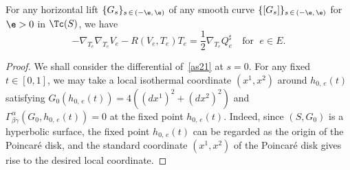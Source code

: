 \begin{lemm}\label{le3}
For any horizontal lift $\{G_s\}_{s\,\in\,(-\e,\,\e)}$ of any smooth curve \linebreak $\{[G_s]\}_{s\,\in\,(-\e,\,\e)}$ for $\e>0$ in $\Tc(S)$, we have
\[
-\nabla_{T_e}\nabla_{T_e}V_e-R\left(V_e, T_e\right)T_e=\frac{1}{2}\nabla_{T_e}Q_{e}^{\sharp} \quad \text{for }\; e \in E.
\]
\end{lemm}

\begin{proof}
We shall consider the differential of~\eqref{as21} at $s=0$. For any fixed $t \in [0, 1]$, we may take a local isothermal coordinate $(x^1,x^2)$ around $h_{0,\,e}(t)$ satisfying $G_0(h_{0,\,e}(t))=4((dx^1)^2+(dx^2)^2)$ and $\Gamma_{\beta\gamma}^{\alpha}(G_0, h_{0,\,e}(t))=0$ at the fixed point $h_{0,\,e}(t)$. Indeed, since $(S,G_0)$ is a hyperbolic surface, the fixed point $h_{0,\,e}(t)$ can be regarded as the origin of the Poincaré disk, and the standard coordinate $(x^1,x^2)$ of the Poincaré disk gives rise to the desired local coordinate.


\end{proof}
